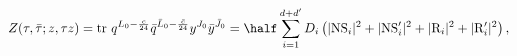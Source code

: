 \begin{equation}
  Z(\tau,\bar \tau; z,\tau z)= {\rm tr}~ q^{L_0-{c\over 24}} \bar
    q^{\bar L_0-{\bar c\over 24}} y^{J_0} \bar y^{\bar J_0} =
    \half\sum_{i=1}^{d+d'} D_i \left( |{\rm NS}_i|^2 + |{\rm NS}'_i|^2
    +|{\rm R}_i|^2 +|{\rm R}'_i|^2 \right),
\end{equation}

